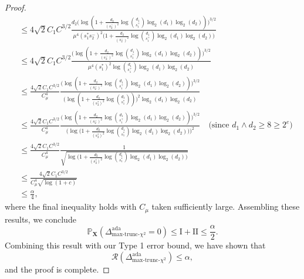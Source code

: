 \documentclass{article}
\newcommand{\X}{\mathbf{X}}
\newcommand{\cR}{\mathcal{R}}
\newcommand{\pr}{\mathbb{P}}
\newcommand{\chisqmax}{\text{max-trunc-$\chi^2$}}
\theoremstyle{remark}
\begin{document}
\begin{proof}
\begin{align*}
    &\leq 4\sqrt{2}C_1C^{3/2}\frac{d_2\big(\log(1 + \frac{d_2}{(s_2^{-})^2}\log {d_1 \choose s_1^+ }\log_2(d_1)\log_2(d_2))\big)^{3/2}}{\mu^4(s_1^*s_2^-)^2\big(1 + \frac{d_2}{(s_2^{-})^2}\log {d_1 \choose s_1^+ }\log_2(d_1)\log_2(d_2)\big)} \\
    &\leq 4\sqrt{2}C_1C^{3/2}\frac{\big(\log(1 + \frac{d_2}{(s_2^{-})^2}\log {d_1 \choose s_1^+ }\log_2(d_1)\log_2(d_2))\big)^{3/2}}{\mu^4(s_1^*)^2\log {d_1 \choose s_1^+ }\log_2(d_1)\log_2(d_2)} \\
    &\leq \frac{4\sqrt{2}C_1C^{3/2}}{C^4_\mu}\frac{\big(\log(1 + \frac{d_2}{(s_2^{-})^2}\log {d_1 \choose s_1^+ }\log_2(d_1)\log_2(d_2))\big)^{3/2}}{\big(\log(1 + \frac{d_2}{(s_2^{*})^2}\log {d_1 \choose s_1^* })\big)^{2}\log_2(d_1)\log_2(d_2)} \\
    &\leq \frac{4\sqrt{2}C_1C^{3/2}}{C^4_\mu}\frac{\big(\log(1 + \frac{d_2}{(s_2^{-})^2}\log {d_1 \choose s_1^+ }\log_2(d_1)\log_2(d_2))\big)^{3/2}}{\Big(\log\big(1 + \frac{d_2}{(s_2^{*})^2}\log {d_1 \choose s_1^* } \log_2(d_1)\log_2(d_2) \big)\Big)^{2}} \quad \text{(since $d_1 \land d_2 \geq 8 \geq 2^e$)} \\
    &\leq \frac{4\sqrt{2}C_1C^{3/2}}{C^4_\mu} \frac{1}{\sqrt{\log\big(1 + \frac{d_2}{(s_2^{*})^2}\log {d_1 \choose s_1^* } \log_2(d_1)\log_2(d_2)\big)}} \\
    &\leq \frac{4\sqrt{2}C_1C^{3/2}}{C^4_\mu \sqrt{\log(1 + c)}} \\
    &\leq \frac{\alpha}{4},
\end{align*}
where the final inequality holds with $C_\mu$ taken sufficiently large. Assembling these results, we conclude
\[\pr_\X \left(\Delta^{\text{ada}}_{\chisqmax} = 0\right) \leq \text{I} + \text{II} \leq \frac{\alpha}{2}.\]
Combining this result with our Type 1 error bound, we have shown that
\[\cR\left(\Delta^{\text{ada}}_{\chisqmax}\right) \leq \alpha,\]
and the proof is complete.
\end{proof}
\end{document}
